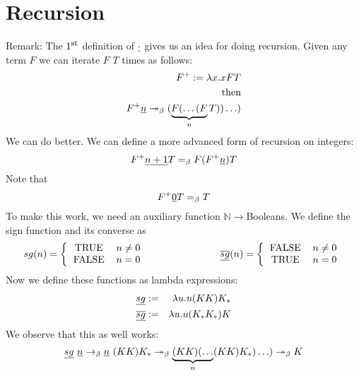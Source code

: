 \section{Recursion}
Remark: The $1^{\hbox{\footnotesize st}}$ definition of $\uline{\cdot}$ gives us an idea for doing recursion. Given any term $F$ we can iterate $F$ $T$ times as follows:
\begin{eqnarray*}
  F^+ := \l x.xFT\\
  \hbox{then}\\
  F^+\uline{n} \twoheadrightarrow_{\beta} (\underbrace{F(\ldots(F}_{n}T))\ldots)
\end{eqnarray*}
We can do better. We can define a more advanced form of recursion on integers:
\begin{equation*}
  F^+\uline{n + 1}T =_\beta F(F^+\uline{n})T
\end{equation*}
Note that
\begin{equation*}
  F^+\uline{0}T =_\beta T
\end{equation*}
To make this work, we need an auxiliary function $\mathbb{N} \rightarrow$Booleans. We define the sign function and its converse as
\begin{equation*}
  sg(n) = \left\{
  \begin{tabular}{cl}
    TRUE & $n \neq 0$\\
    FALSE & $n = 0$\\
  \end{tabular}
  \right.
  \hspace{1in}
  \uline{\overline{sg}}(n) = \left\{
  \begin{tabular}{cl}
    FALSE& $n \neq 0$\\
    TRUE & $n = 0$\\
  \end{tabular}
  \right.
\end{equation*}
Now we define these functions as lambda expressions:
\begin{eqnarray*}
  \uline{sg} &:=& \l u . u(KK)K_*\\
  \uline{\overline{sg}} &:=& \l u . u(K_*K_*)K\\
\end{eqnarray*}
We observe that this as well works:
\begin{equation*}
  \uline{sg}\ \uline{n} \rightarrow_\beta \uline{n}\ (KK)K_* \twoheadrightarrow_{\beta} \underbrace{(KK)(\ldots}_{n}(KK)K_*)\ldots) \twoheadrightarrow_\beta K
\end{equation*}

